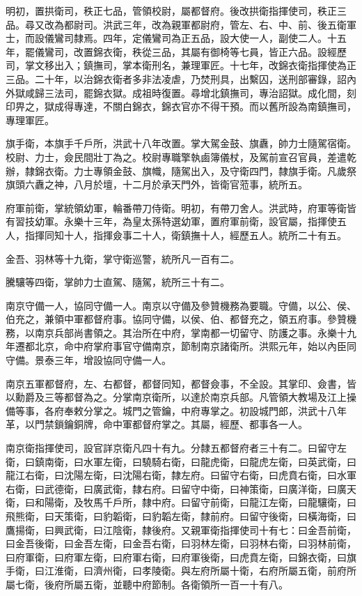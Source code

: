 明初，置拱衛司，秩正七品，管領校尉，屬都督府。後改拱衛指揮使司，秩正三品。尋又改為都尉司。洪武三年，改為親軍都尉府，管左、右、中、前、後五衛軍士，而設儀鸞司隸焉。四年，定儀鸞司為正五品，設大使一人，副使二人。十五年，罷儀鸞司，改置錦衣衛，秩從三品，其屬有御椅等七員，皆正六品。設經歷司，掌文移出入；鎮撫司，掌本衛刑名，兼理軍匠。十七年，改錦衣衛指揮使為正三品。二十年，以治錦衣衛者多非法凌虐，乃焚刑具，出繫囚，送刑部審錄，詔內外獄咸歸三法司，罷錦衣獄。成祖時復置。尋增北鎮撫司，專治詔獄。成化間，刻印畀之，獄成得專達，不關白錦衣，錦衣官亦不得干預。而以舊所設為南鎮撫司，專理軍匠。

旗手衛，本旗手千戶所，洪武十八年改置。掌大駕金鼓、旗纛，帥力士隨駕宿衛。校尉、力士，僉民間壯丁為之。校尉專職擎執鹵簿儀杖，及駕前宣召官員，差遣乾辦，隸錦衣衛。力士專領金鼓、旗幟，隨駕出入，及守衛四門，隸旗手衛。凡歲祭旗頭六纛之神，八月於壇，十二月於承天門外，皆衛官蒞事，統所五。

府軍前衛，掌統領幼軍，輪番帶刀侍衛。明初，有帶刀舍人。洪武時，府軍等衛皆有習技幼軍。永樂十三年，為皇太孫特選幼軍，置府軍前衛，設官屬，指揮使五人，指揮同知十人，指揮僉事二十人，衛鎮撫十人，經歷五人。統所二十有五。

金吾、羽林等十九衛，掌守衛巡警，統所凡一百有二。

騰驤等四衛，掌帥力士直駕、隨駕，統所三十有二。

南京守備一人，協同守備一人。南京以守備及參贊機務為要職。守備，以公、侯、伯充之，兼領中軍都督府事。協同守備，以侯、伯、都督充之，領五府事。參贊機務，以南京兵部尚書領之。其治所在中府，掌南都一切留守、防護之事。永樂十九年遷都北京，命中府掌府事官守備南京，節制南京諸衛所。洪熙元年，始以內臣同守備。景泰三年，增設協同守備一人。

南京五軍都督府，左、右都督，都督同知，都督僉事，不全設。其掌印、僉書，皆以勳爵及三等都督為之。分掌南京衛所，以達於南京兵部。凡管領大教場及江上操備等事，各府奉敕分掌之。城門之管鑰，中府專掌之。初設城門郎，洪武十八年革，以門禁鎖鑰銅牌，命中軍都督府掌之。其屬，經歷、都事各一人。

南京衛指揮使司，設官詳京衛凡四十有九。分隸五都督府者三十有二。曰留守左衛，曰鎮南衛，曰水軍左衛，曰驍騎右衛，曰龍虎衛，曰龍虎左衛，曰英武衛，曰龍江右衛，曰沈陽左衛，曰沈陽右衛，隸左府。曰留守右衛，曰虎賁右衛，曰水軍右衛，曰武德衛，曰廣武衛，隸右府。曰留守中衛，曰神策衛，曰廣洋衛，曰廣天衛，曰和陽衛，及牧馬千戶所，隸中府。曰留守前衛，曰龍江左衛，曰龍驤衛，曰飛熊衛，曰天策衛，曰豹韜衛，曰豹韜左衛，隸前府。曰留守後衛，曰橫海衛，曰鷹揚衛，曰興武衛，曰江陰衛，隸後府。又親軍衛指揮使司十有七：曰金吾前衛，曰金吾後衛，曰金吾左衛，曰金吾右衛，曰羽林左衛，曰羽林右衛，曰羽林前衛，曰府軍衛，曰府軍左衛，曰府軍右衛，曰府軍後衛，曰虎賁左衛，曰錦衣衛，曰旗手衛，曰江淮衛，曰濟州衛，曰孝陵衛。與左府所屬十衛，右府所屬五衛，前府所屬七衛，後府所屬五衛，並聽中府節制。各衛領所一百一十有八。

